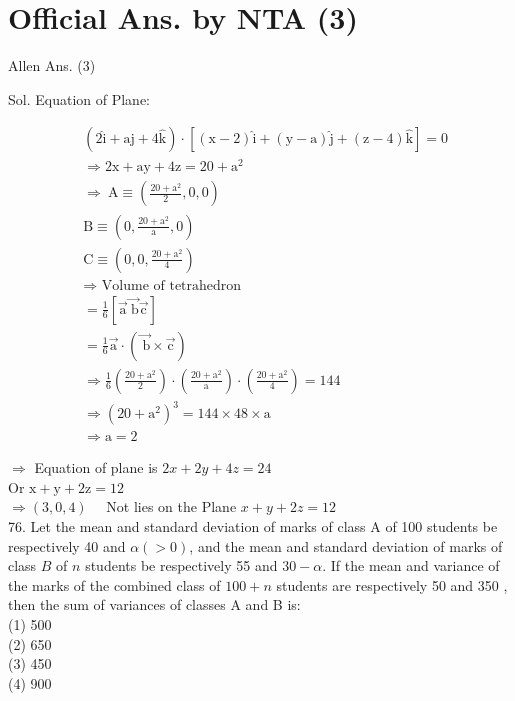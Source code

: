 \documentclass[10pt]{article}
\begin{document}
\section*{Official Ans. by NTA (3)}
Allen Ans. (3)

Sol. Equation of Plane:

\[
\begin{aligned}
& (2 \hat{\mathrm{i}}+\mathrm{aj}+4 \hat{\mathrm{k}}) \cdot[(\mathrm{x}-2) \hat{\mathrm{i}}+(\mathrm{y}-\mathrm{a}) \hat{\mathrm{j}}+(\mathrm{z}-4) \hat{\mathrm{k}}]=0 \\
& \Rightarrow 2 \mathrm{x}+\mathrm{ay}+4 \mathrm{z}=20+\mathrm{a}^{2} \\
& \Rightarrow \mathrm{~A} \equiv\left(\frac{20+\mathrm{a}^{2}}{2}, 0,0\right) \\
& \mathrm{B} \equiv\left(0, \frac{20+\mathrm{a}^{2}}{\mathrm{a}}, 0\right) \\
& \mathrm{C} \equiv\left(0,0, \frac{20+\mathrm{a}^{2}}{4}\right) \\
& \Rightarrow \text { Volume of tetrahedron } \\
& =\frac{1}{6}[\overrightarrow{\mathrm{a}} \overrightarrow{\mathrm{~b}} \overrightarrow{\mathrm{c}}] \\
& =\frac{1}{6} \overrightarrow{\mathrm{a}} \cdot(\overrightarrow{\mathrm{~b}} \times \overrightarrow{\mathrm{c}}) \\
& \Rightarrow \frac{1}{6}\left(\frac{20+\mathrm{a}^{2}}{2}\right) \cdot\left(\frac{20+\mathrm{a}^{2}}{\mathrm{a}}\right) \cdot\left(\frac{20+\mathrm{a}^{2}}{4}\right)=144 \\
& \Rightarrow\left(20+\mathrm{a}^{2}\right)^{3}=144 \times 48 \times \mathrm{a} \\
& \Rightarrow \mathrm{a}=2
\end{aligned}
\]

\(\Rightarrow\) Equation of plane is \(2 x+2 y+4 z=24\)\\
Or \(\mathrm{x}+\mathrm{y}+2 \mathrm{z}=12\)\\
\(\Rightarrow(3,0,4) \quad\) Not lies on the Plane \(x+y+2 z=12\)\\
76. Let the mean and standard deviation of marks of class A of 100 students be respectively 40 and \(\alpha(>0)\), and the mean and standard deviation of marks of class \(B\) of \(n\) students be respectively 55 and \(30-\alpha\). If the mean and variance of the marks of the combined class of \(100+n\) students are respectively 50 and 350 , then the sum of variances of classes A and B is:\\
(1) 500\\
(2) 650\\
(3) 450\\
(4) 900
\end{document}
